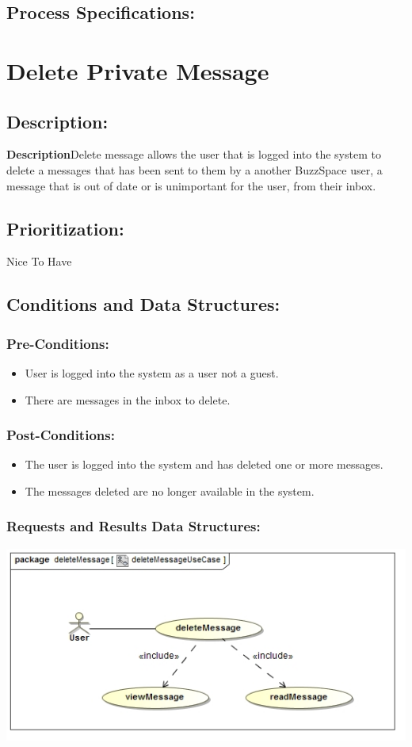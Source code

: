 \documentclass[a4paper,11pt]{article}
\begin{document}
\subsection{Process Specifications:} 

\section{Delete Private Message}
\subsection*{Description:}
\textbf{Description}Delete message allows the user that is logged into the system to delete a messages that has been sent to them by a another BuzzSpace user, a message that is out of date or is unimportant for the user, from their inbox.
\subsection{Prioritization:} 
\textbf{}Nice To Have
\subsection{Conditions and Data Structures:}
\subsubsection*{Pre-Conditions:}
\begin{itemize}
\item User is logged into the system as a user not a guest. 
\item There are messages in the inbox to delete.
\end{itemize}
\subsubsection*{Post-Conditions:}
\begin{itemize}
\item The user is logged into the system and has deleted one or more messages.
\item The messages deleted are no longer available in the system.
\end{itemize}
\subsubsection*{Requests and Results Data Structures:}
\includegraphics[width=1\linewidth]{./Images/PrivateMessage/deleteMessageUseCase}
\end{document}
